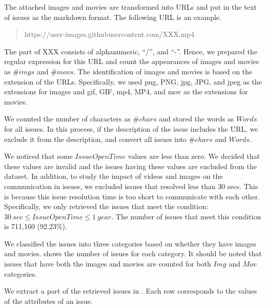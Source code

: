 The attached images and movies are transformed into 
URLs and put in the text of issues as the markdown format. 
The following URL is an example.

\begin{quote}
	https://user-images.githubusercontent.com/XXX.mp4
\end{quote}

\noindent{}
The part of XXX consists of alphanumeric, ``/'', and ``-''.
Hence, we prepared the regular expression for this URL and 
count the appearances of images and movies as $\#imgs$ and $\#movs$. 
The identification of images and movies is based on the extension of 
the URLs. 
Specifically, we used png, PNG, jpg, JPG, and jpeg as 
the extensions for images and 
gif, GIF, mp4, MP4, and mov as the extensions for movies.

We counted the number of characters as $\#chars$ and 
stored the words as $Words$ for all issues. 
In this process, if the description of the issue 
includes the URL, we exclude it from the description, 
and convert all issues into $\#chars$ and $Words$.

We noticed that some $IssueOpenTime$ values are less than zero. 
We decided that these values are invalid and the issues having 
these values are excluded from the dataset. 
In addition, to study the impact of videos and images on 
the communication in issues, 
we excluded issues that resolved less than 30 secs. 
This is because this issue resolution time is too short 
to communicate with each other. 
Specifically, we only retrieved the issues that meet 
the condition: $30\ sec \leq IssueOpenTime \leq 1\ year$.
The number of issues that meet this condition is 711,160 (92.23\%).



We classified the issues into three categories based on 
whether they have images and movies. 
 shows the number of issues for each category. 
It should be noted that issues that have both 
the images and movies are counted for both 
$Img$ and $Mov$ categories. 



We extract a part of the retrieved issues in . 
Each row corresponds to the values of the attributes of an issue. 



